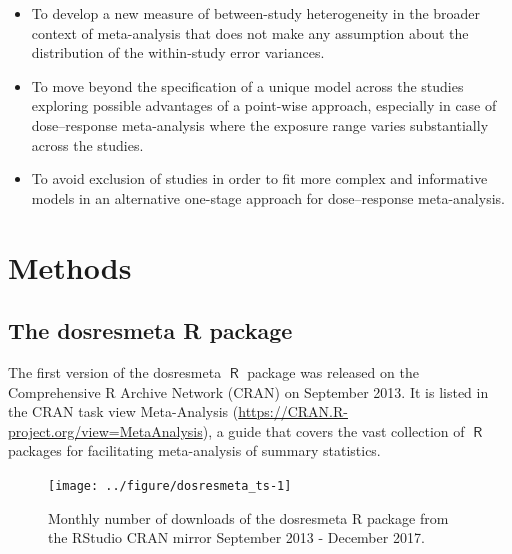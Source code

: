\documentclass[11pt,a4paper,twoside,openany]{book}\usepackage{knitr}
\newcommand{\pkg}[1]{{\fontseries{b}\selectfont #1}}
\DeclareMathOperator{\R}{\textsf{R}}
\begin{document}
{{\begin{itemize}
\item To develop a new measure of between-study heterogeneity in the broader context of meta-analysis that does not make any assumption about the distribution of the within-study error variances.

\item To move beyond the specification of a unique model across the studies exploring possible advantages of a point-wise approach, especially in case of dose--response meta-analysis where the exposure range varies substantially across the studies.

\item To avoid exclusion of studies in order to fit more complex and informative models in an alternative one-stage approach for dose--response meta-analysis.

\end{itemize}


%

\chapter{Methods}

\section{The \pkg{dosresmeta} \textsf{R} package}

The first version of the \pkg{dosresmeta} $\R$ package was released on the Comprehensive R Archive Network (CRAN) on September 2013. It is listed in the CRAN task view Meta-Analysis (\url{https://CRAN.R-project.org/view=MetaAnalysis}), a guide that covers the vast collection of $\R$ packages for facilitating meta-analysis of summary statistics.

\begin{knitrout}\footnotesize
{}\color{fgcolor}\begin{figure}[ht!]

{\centering \texttt{[image: ../figure/dosresmeta\_ts-1]} 

}

\caption[Monthly number of downloads of the dosresmeta R package from the RStudio CRAN mirror September 2013 - December 2017]{Monthly number of downloads of the dosresmeta R package from the RStudio CRAN mirror September 2013 - December 2017.}\label{fig:dosresmeta_ts}
\end{figure}



\end{knitrout}}}
\end{document}
